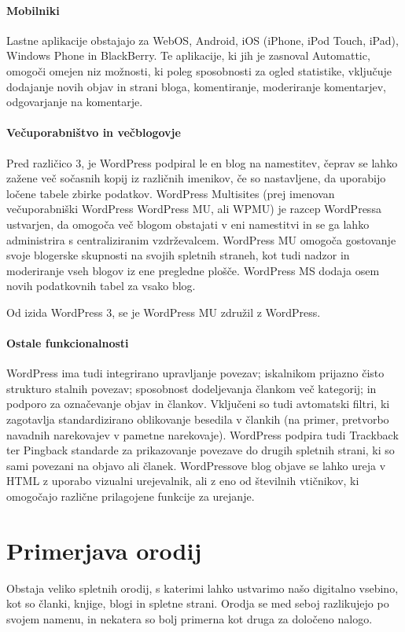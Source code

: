 \documentclass[a4paper, 12pt]{book}
\begin{document}
\paragraph{Mobilniki}
Lastne aplikacije obstajajo za WebOS, \cite{94} Android, \cite{95} iOS (iPhone, iPod Touch, iPad), \cite{96} \cite{97} Windows Phone in BlackBerry. \cite{98} Te aplikacije, ki jih je zasnoval Automattic, omogoči omejen niz možnosti, ki poleg sposobnosti za ogled statistike, vključuje dodajanje novih objav in strani bloga, komentiranje, moderiranje komentarjev, odgovarjanje na komentarje. \cite{96} \cite{97} 

\paragraph{Večuporabništvo in večblogovje}
Pred različico 3, je WordPress podpiral le en blog na namestitev, čeprav se lahko zažene več sočasnih  kopij iz različnih imenikov, če so nastavljene, da uporabijo ločene tabele zbirke podatkov. WordPress Multisites (prej imenovan večuporabniški WordPress WordPress MU, ali WPMU) je  razcep WordPressa ustvarjen, da omogoča več blogom obstajati v eni namestitvi in se ga lahko administrira s centraliziranim vzdrževalcem. WordPress MU omogoča gostovanje svoje blogerske skupnosti na svojih spletnih straneh, kot tudi nadzor in moderiranje vseh blogov iz ene pregledne plošče. WordPress MS dodaja osem novih podatkovnih tabel za vsako blog.

Od izida WordPress 3, se je WordPress MU združil z WordPress. \cite{99}

\paragraph{Ostale funkcionalnosti}
WordPress ima tudi integrirano upravljanje povezav; iskalnikom prijazno čisto strukturo stalnih povezav; sposobnost dodeljevanja člankom več kategorij; in podporo za označevanje objav in člankov. Vključeni so tudi avtomatski filtri, ki zagotavlja standardizirano oblikovanje besedila v člankih (na primer, pretvorbo navadnih narekovajev v pametne narekovaje). WordPress podpira tudi Trackback ter Pingback standarde za prikazovanje povezave do drugih spletnih strani, ki so sami povezani na objavo ali članek. WordPressove blog objave se lahko ureja v HTML z uporabo vizualni urejevalnik, ali z eno od številnih vtičnikov, ki omogočajo različne prilagojene funkcije za urejanje. 

\section{Primerjava orodij}
\label{orodja_vrednotenje}
Obstaja veliko spletnih orodij, s katerimi lahko ustvarimo našo digitalno vsebino, kot so članki, knjige, blogi in spletne strani. Orodja se med seboj razlikujejo po svojem namenu, in nekatera so bolj primerna kot druga za določeno nalogo. 
\end{document}
